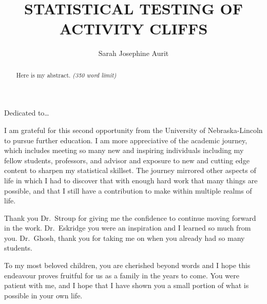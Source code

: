 \documentclass[print]{nuthesis}
\begin{document}
\frontmatter
\title{STATISTICAL TESTING OF ACTIVITY CLIFFS}
\author{Sarah Josephine Aurit}
\maketitle


\begin{abstract}
    Here is my abstract. \emph{(350 word limit)}
\end{abstract}

\begin{copyrightpage}
\end{copyrightpage}

\begin{dedication}
Dedicated to\ldots{}
\end{dedication}

\begin{acknowledgments}
I am grateful for this second opportunity from the University of Nebraska-Lincoln to pursue further education. I am more appreciative of the academic journey, which includes meeting so many new and inspiring individuals including my fellow students, professors, and advisor and exposure to new and cutting edge content to sharpen my statistical skillset. The journey mirrored other aspects of life in which I had to discover that with enough hard work that many things are possible, and that I still have a contribution to make within multiple realms of life.

Thank you Dr.~Stroup for giving me the confidence to continue moving forward in the work. Dr.~Eskridge you were an inspiration and I learned so much from you. Dr.~Ghosh, thank you for taking me on when you already had so many students.

To my most beloved children, you are cherished beyond words and I hope this endeavour proves fruitful for us as a family in the years to come. You were patient with me, and I hope that I have shown you a small portion of what is possible in your own life.
\end{acknowledgments}
\end{document}
